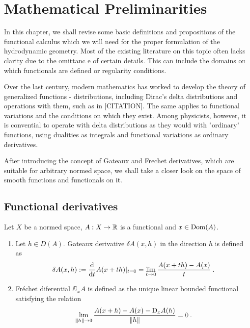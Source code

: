 \chapter{Mathematical Preliminarities}

In this chapter, we shall revise some basic definitions and propositions of the functional calculus which we will need for the proper formulation of the hydrodynamic geometry.  Most of the existing literature on this topic often lacks clarity due to the omittanc e of certain details. This can include the domains on which functionals are defined or regularity conditions.

Over the last century, modern mathematics has worked to develop the theory of generalized functions - distributions, including Dirac's delta distributions and operations with them, such as in [CITATION]. The same applies to functional variations and the conditions on which they exist. 
Among physicists, however, it is convential to operate with delta distributions as they would with "ordinary" functions, using dualities as integrals and functional variations as ordinary derivatives.


After introducing the concept of Gateaux and Frechet derivatives, which are suitable for arbitrary normed space, we shall take a closer look on the space of smooth functions and functionals on it.

\section{Functional derivatives}


\begin{definition}
    Let $X$ be a normed space, $A: X \to \mathbb{R}$ is a functional and $x \in \mathrm{Dom}(A)$.
    \begin{enumerate}
        \item Let $h \in D(A)$. Gateaux derivative $\delta A(x,h)$ in the direction $h$ is defined as
        \begin{align}
            \delta A (x,h) := \frac{\mathrm{d}}{\mathrm{d}t} A(x+th) |_{t=0} = \lim_{t \rightarrow 0} \frac{A(x+th)-A(x)}{t} \:.
        \end{align}

        \item Fréchet diferential $\DD_x A$ is defined as the unique linear bounded functional satisfying the relation
        \begin{align}
            \lim_{\left \Vert h \right \Vert \rightarrow 0} \frac{A(x+h)-A(x)- \mathrm{D}_x A(h)}{\left \Vert h \right \Vert} = 0 \:.
        \end{align}
    \end{enumerate}
\end{definition}

